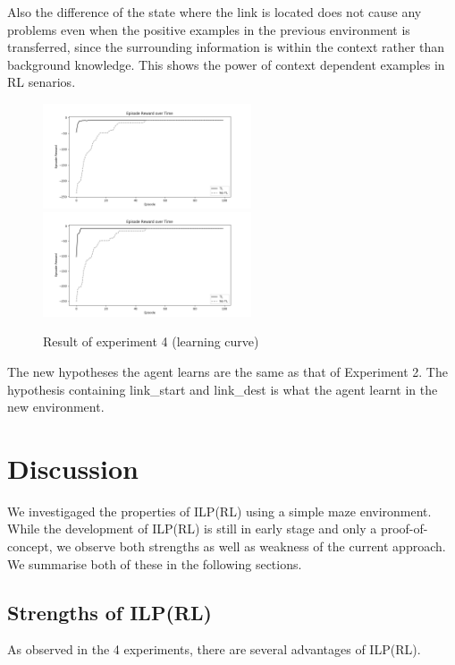 Also the difference of the state where the link is located does not cause any problems even when the positive examples in the previous environment is transferred, since the surrounding information is within the context rather than background knowledge. 
This shows the power of context dependent examples in RL senarios.

\begin{figure}[!htb]
\centerline{
\includegraphics[width=0.55\textwidth]{./figures/experiment4_training}
\includegraphics[width=0.55\textwidth]{./figures/experiment4_test}
}
\caption{Result of experiment 4 (learning curve)}
\label{experiment4_training_test}
\end{figure}

The new hypotheses the agent learns are the same as that of Experiment 2. The hypothesis containing \textsf{link\_start} and \textsf{link\_dest} is what the agent learnt in the new environment.



\clearpage

\section{Discussion}
\label{sec:discussion}

We investigaged the properties of ILP(RL) using a simple maze environment. While the development of ILP(RL) is still in early stage and only a proof-of-concept, 
we observe both strengths as well as weakness of the current approach. We summarise both of these in the following sections.

\subsection{Strengths of ILP(RL)}
As observed in the 4 experiments, there are several advantages of ILP(RL).

